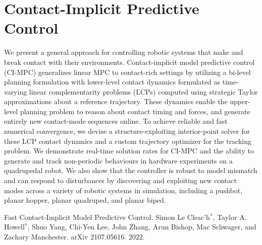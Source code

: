 \chapter{Contact-Implicit Predictive Control}

We present a general approach for controlling robotic systems that make and break contact with their environments. Contact-implicit model predictive control (CI-MPC) generalizes linear MPC to contact-rich settings by utilizing a bi-level planning formulation with lower-level contact dynamics formulated as time-varying linear complementarity problems (LCPs) computed using strategic Taylor approximations about a reference trajectory. These dynamics enable the upper-level planning problem to reason about contact timing and forces, and generate entirely new contact-mode sequences online. To achieve reliable and fast numerical convergence, we devise a structure-exploiting interior-point solver for these LCP contact dynamics and a custom trajectory optimizer for the tracking problem. We demonstrate real-time solution rates for CI-MPC and the ability to generate and track non-periodic behaviours in hardware experiments on a quadrupedal robot. We also show that the controller is robust to model mismatch and can respond to disturbances by discovering and exploiting new contact modes across a variety of robotic systems in simulation, including a pushbot, planar hopper, planar quadruped, and planar biped.

\vspace*{\fill}

\noindent Fast Contact-Implicit Model Predictive  Control. Simon Le Cleac'h$^*$, Taylor A. Howell$^*$, Shuo Yang, Chi-Yen Lee, John Zhang, Arun Bishop, Mac Schwager, and Zachary Manchester. arXiv 2107.05616. 2022.

\pagebreak 

